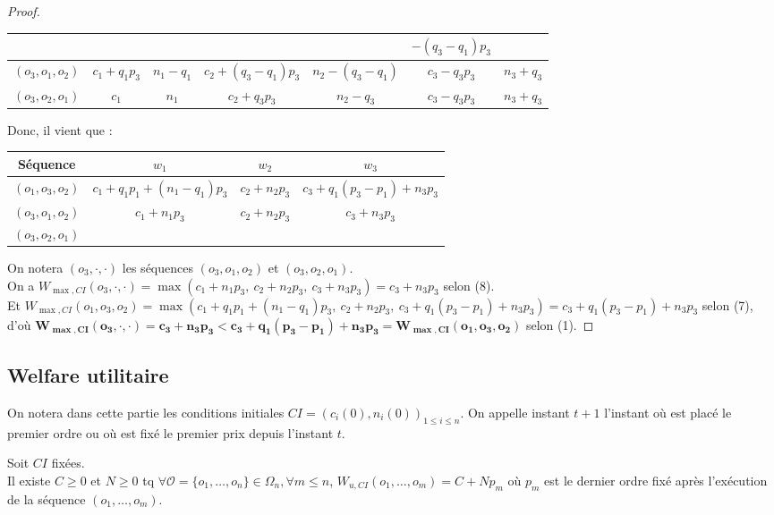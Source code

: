 \documentclass[a4paper]{article}
\newcommand{\Oc}{\mathcal{O}}
\newtheorem[style=S, bodystyle=\noindent]{thm}{Théorème}[section]
\newtheorem[style=S, bodystyle=\noindent]{defn}[thm]{Définition}
\newtheorem[style=S, bodystyle=\noindent]{propo}[thm]{Proposition}
\newtheorem[style=S, bodystyle=\noindent]{prop}[thm]{Propriété}
\newtheorem[style=S, bodystyle=\noindent]{coro}[thm]{Corollaire}
\newtheorem[style=S, bodystyle=\noindent]{lem}[thm]{Lemme}
\newtheorem[style=S, headstyle=\bfseries\boldmath Théorème, bodystyle=\noindent]{thm*}{Théorème}
\newtheorem[style=S, headstyle=\bfseries\boldmath Définition, bodystyle=\noindent]{defn*}{Définition}
\newtheorem[style=S, headstyle=\bfseries\boldmath Proposition, bodystyle=\noindent]{propo*}{Proposition}
\newtheorem[style=S, headstyle=\bfseries\boldmath Propriété, bodystyle=\noindent]{prop*}{Propriété}
\newtheorem[style=S, headstyle=\bfseries\boldmath Corollaire, bodystyle=\noindent]{coro*}{Corollaire}
\newtheorem[style=S, headstyle=\bfseries\boldmath Lemme, bodystyle=\noindent]{lem*}{Lemme}
\begin{document}
\begin{proof}
\begin{center}
\begin{tabular}{|c|c|c|c|c|c|c|}
		& & & & &  $-(q_3-q_1)p_3$ & \\
		\hline
		$(o_3,o_1,o_2)$ & $c_1+q_1p_3$ & $n_1-q_1$ & $c_2 + (q_3-q_1)p_3$ & $n_2 - (q_3-q_1)$ & $c_3 - q_3p_3$ & $n_3+q_3$ \\
		\hline
		$(o_3,o_2,o_1)$ & $c_1$ & $n_1$ & $c_2+q_3p_3$ & $n_2-q_3$ & $c_3-q_3p_3$ & $n_3+q_3$ \\
		\hline
	\end{tabular}
	\end{center}
	Donc, il vient que :
	\begin{center}
	\begin{tabular}{|c|c|c|c|}
		\hline
		Séquence & $w_1$ & $w_2$ & $w_3$ \\
		\hline
		$(o_1, o_3, o_2)$ & $c_1 + q_1p_1 + (n_1-q_1)p_3$ & $c_2+n_2p_3$ & $c_3+q_1(p_3-p_1)+n_3p_3$ \\
		\hline
		$(o_3,o_1,o_2)$ & \multirow{2}{*}{$c_1+n_1p_3$} & \multirow{2}{*}{$c_2+n_2p_3$} & \multirow{2}{*}{$c_3+n_3p_3$} \\
		\cline{1-1}
		$(o_3,o_2,o_1)$ & & & \\
		\hline
	\end{tabular}
	\end{center}
	On notera $(o_3, \cdot, \cdot)$ les séquences $(o_3,o_1,o_2)$ et $(o_3,o_2,o_1)$. \\
	On a $W_{\max,CI}(o_3, \cdot, \cdot) = \max(c_1+n_1p_3,~c_2+n_2p_3,~c_3+n_3p_3) = c_3+n_3p_3$ selon (8). \\
	Et $W_{\max,CI}(o_1, o_3, o_2) = \max(c_1 + q_1p_1 + (n_1-q_1)p_3,~c_2+n_2p_3,~c_3+q_1(p_3-p_1)+n_3p_3) = c_3+q_1(p_3-p_1)+n_3p_3$ selon (7), \\
	d'où $\boldsymbol{W_{\max,CI}(o_3, \cdot, \cdot) = c_3+n_3p_3 < c_3+q_1(p_3-p_1)+n_3p_3 = W_{\max,CI}(o_1, o_3, o_2)}$ selon (1).
\end{proof}

\subsection{Welfare utilitaire}

On notera dans cette partie les conditions initiales $CI = (c_i(0), n_i(0))_{1\leq i\leq n}$. On appelle instant $t+1$ l'instant où est placé le premier ordre ou où est fixé le premier prix depuis l'instant $t$.

\begin{lem}
	Soit $CI$ fixées. \\
	Il existe $C\geq 0$ et $N\geq 0$ tq $\forall \Oc = \{o_1, \ldots, o_n\}\in \Omega_n, \forall m \leq n$, $W_{u, CI}(o_1, \ldots, o_m) = C + Np_m$ où $p_m$ est le dernier ordre fixé après l'exécution de la séquence $(o_1, \ldots, o_m)$.
\end{lem}
\end{document}
